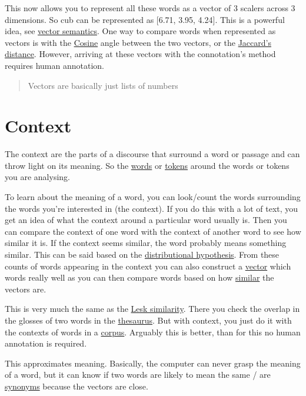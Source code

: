 \documentclass[
  11pt,
  british,
]{article}
\begin{document}
This now allows you to represent all these words as a vector of 3
scalers across 3 dimensions. So cub can be represented as {[}6.71, 3.95,
4.24{]}. This is a powerful idea, see
\href{Vector\%20semantics.md}{vector semantics}. One way to compare
words when represented as vectors is with the \href{Cosine.md}{Cosine}
angle between the two vectors, or the
\href{Jaccard's\%20distance.md}{Jaccard's distance}. However, arriving
at these vectors with the connotation's method requires human
annotation.

\begin{quote}
Vectors are basically just lists of numbers
\end{quote}

\hypertarget{context-1}{%
\section{Context}\label{context-1}}

The context are the parts of a discourse that surround a word or passage
and can throw light on its meaning. So the
\href{../Data/Words.md}{words} or \href{../Data/Token.md}{tokens} around
the words or tokens you are analysing.

To learn about the meaning of a word, you can look/count the words
surrounding the words you're interested in (the context). If you do this
with a lot of text, you get an idea of what the context around a
particular word usually is. Then you can compare the context of one word
with the context of another word to see how similar it is. If the
context seems similar, the word probably means something similar. This
can be said based on the
\href{Distributional\%20hypothesis.md}{distributional hypothesis}. From
these counts of words appearing in the context you can also construct a
\href{Vector\%20semantics.md}{vector} which words really well as you can
then compare words based on how \href{Similarity.md}{similar} the
vectors are.

This is very much the same as the \href{../Data/Thesaurus.md}{Lesk
similarity}. There you check the overlap in the glosses of two words in
the \href{../Data/Thesaurus.md}{thesaurus}. But with context, you just
do it with the contexts of words in a \href{../Data/Corpus.md}{corpus}.
Arguably this is better, than for this no human annotation is required.

This approximates meaning. Basically, the computer can never grasp the
meaning of a word, but it can know if two words are likely to mean the
same / are \href{../Languages/Synonyms.md}{synonyms} because the vectors
are close.
\end{document}
